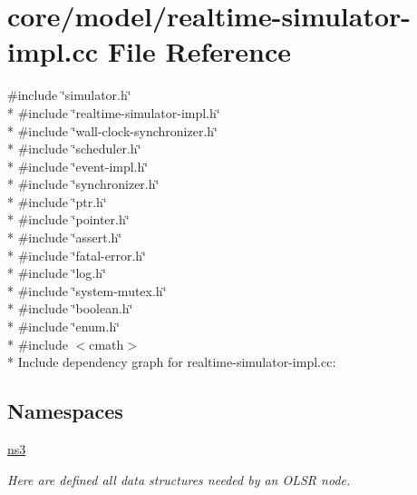 \hypertarget{realtime-simulator-impl_8cc}{}\section{core/model/realtime-\/simulator-\/impl.cc File Reference}
\label{realtime-simulator-impl_8cc}
{\ttfamily \#include \char`\"{}simulator.\+h\char`\"{}}\\*
{\ttfamily \#include \char`\"{}realtime-\/simulator-\/impl.\+h\char`\"{}}\\*
{\ttfamily \#include \char`\"{}wall-\/clock-\/synchronizer.\+h\char`\"{}}\\*
{\ttfamily \#include \char`\"{}scheduler.\+h\char`\"{}}\\*
{\ttfamily \#include \char`\"{}event-\/impl.\+h\char`\"{}}\\*
{\ttfamily \#include \char`\"{}synchronizer.\+h\char`\"{}}\\*
{\ttfamily \#include \char`\"{}ptr.\+h\char`\"{}}\\*
{\ttfamily \#include \char`\"{}pointer.\+h\char`\"{}}\\*
{\ttfamily \#include \char`\"{}assert.\+h\char`\"{}}\\*
{\ttfamily \#include \char`\"{}fatal-\/error.\+h\char`\"{}}\\*
{\ttfamily \#include \char`\"{}log.\+h\char`\"{}}\\*
{\ttfamily \#include \char`\"{}system-\/mutex.\+h\char`\"{}}\\*
{\ttfamily \#include \char`\"{}boolean.\+h\char`\"{}}\\*
{\ttfamily \#include \char`\"{}enum.\+h\char`\"{}}\\*
{\ttfamily \#include $<$cmath$>$}\\*
Include dependency graph for realtime-\/simulator-\/impl.cc\+:
\subsection*{Namespaces}
\begin{DoxyCompactItemize}
\item 
 \hyperlink{namespacens3}{ns3}
\begin{DoxyCompactList}\small\item\em Here are defined all data structures needed by an O\+L\+SR node. \end{DoxyCompactList}\end{DoxyCompactItemize}
